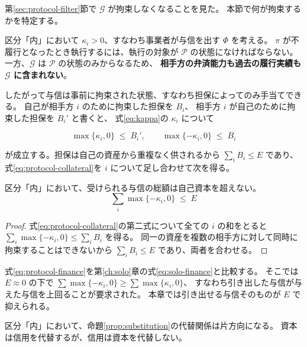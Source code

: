 第\ref{sec:protocol-filter}節で $\mathcal{G}$ が拘束しなくなることを見た。
本節で何が拘束するかを特定する。

区分「内」において $\kappa_i>0$、すなわち事業者が与信を出す $\Phi$ を考える。
$\pi$ が不履行となったとき執行するには、執行の対象が $\mathcal{P}$ の状態になければならない。
一方、$\mathcal{G}$ は $\mathcal{P}$ の状態のみからなるため、
\textbf{相手方の弁済能力も過去の履行実績も $\mathcal{G}$ に含まれない}。

したがって与信は事前に拘束された状態、すなわち担保によってのみ手当てできる。
自己が相手方 $i$ のために拘束した担保を $B_i$、
相手方 $i$ が自己のために拘束した担保を $B_i'$ と書くと、
式\eqref{eq:kappa}の $\kappa_i$ について

\begin{equation}
\max\{\kappa_i,0\} \;\leq\; B_i',
\qquad
\max\{-\kappa_i,0\} \;\leq\; B_i
\label{eq:protocol-collateral}
\end{equation}

が成立する。担保は自己の資産から重複なく供されるから $\sum_i B_i\leq E$ であり、
式\eqref{eq:protocol-collateral}を $i$ について足し合わせて次を得る。

\begin{proposition}[担保制約]
\label{prop:collateral}
区分「内」において、受けられる与信の総額は自己資本を超えない。
\begin{equation}
\sum_i \max\{-\kappa_i,0\} \;\leq\; E
\label{eq:protocol-finance}
\end{equation}
\end{proposition}

\begin{proof}
式\eqref{eq:protocol-collateral}の第二式について全ての $i$ の和をとると
$\sum_i\max\{-\kappa_i,0\}\leq\sum_i B_i$ を得る。
同一の資産を複数の相手方に対して同時に拘束することはできないから
$\sum_i B_i\leq E$ であり、両者を合わせる。
\end{proof}

式\eqref{eq:protocol-finance}を第\ref{ch:solo}章の式\eqref{eq:solo-finance}と比較する。
そこでは $E\approx 0$ の下で $\sum\max\{-\kappa_i,0\}\geq\sum\max\{\kappa_i,0\}$、
すなわち引き出した与信が与えた与信を上回ることが要求された。
本章では引き出せる与信そのものが $E$ で抑えられる。

\begin{corollary}[代替が片方向に退化する]
\label{cor:one-way-substitution}
区分「内」において、命題\ref{prop:substitution}の代替関係は片方向になる。
資本は信用を代替するが、信用は資本を代替しない。
\end{corollary}

